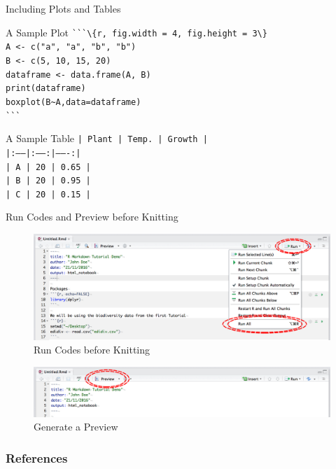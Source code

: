 \documentclass[9pt,handout]{beamer}
\newcommand{\skipv}{\vspace{8pt}}
\begin{document}
\begin{frame}{Including Plots and Tables}

    \begin{block}{A Sample Plot}
        \quad    \Verb|```\{r, fig.width = 4, fig.height = 3\}| \\
        \quad    \Verb|A <- c("a", "a", "b", "b")| \\
        \quad    \Verb|B <- c(5, 10, 15, 20)| \\
        \quad    \Verb|dataframe <- data.frame(A, B)| \\
        \quad    \Verb|print(dataframe)| \\
        \quad    \Verb|boxplot(B~A,data=dataframe)| \\
        \quad    \Verb|```|
    \end{block}
    \skipv
    \begin{block}{A Sample Table}
        \quad    \texttt{| Plant | Temp. | Growth |}\\
        \quad    \texttt{|:------|:-----:|-------:|}\\
        \quad    \texttt{| A     | 20    | 0.65   |}\\
        \quad    \texttt{| B     | 20    | 0.95   |}\\
        \quad    \texttt{| C     | 20    | 0.15   |}
    \end{block}
\end{frame}

\begin{frame}{Run Codes and Preview before Knitting}
    \begin{figure}
    \includegraphics[width=\textwidth]{Notebook_Run.jpg}
    \caption{Run Codes before Knitting}
    \end{figure}
    \begin{figure}
    \includegraphics[width=\textwidth]{Notebook_Preview.jpg}
    \caption{Generate a Preview}
    \end{figure}
\end{frame}


\begin{frame}[allowframebreaks]
    \frametitle{References}
    
    
\end{frame}
\end{document}
